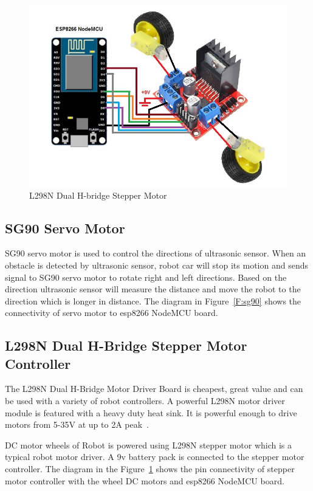 \begin{figure}[htb]
	\centering\includegraphics[width=\columnwidth]{images/L298N_Hbridge.jpg}
	\caption{L298N Dual H-bridge Stepper Motor}\label{F:stepper}
\end{figure}

\subsection{SG90 Servo Motor}
SG90 servo motor is used to control the directions of ultrasonic sensor. 
When an obstacle is detected by ultrasonic sensor, robot car will stop its 
motion and sends signal to SG90 servo motor to rotate right and left 
directions. Based on the direction ultrasonic sensor will measure the 
distance and move the robot to the direction which is longer in distance. 
The diagram in Figure~\ref{F:sg90} shows the  connectivity of servo motor to 
esp8266 NodeMCU board.

\subsection{L298N Dual H-Bridge Stepper Motor Controller}
The L298N Dual H-Bridge Motor Driver Board is cheapest, great value and can 
be used with a variety of robot controllers. A powerful L298N motor driver 
module is featured with a heavy duty heat sink. It is powerful enough to 
drive motors from 5-35V at up to 2A peak~\cite{bananarobotics2013}.

DC motor wheels of Robot is powered using L298N stepper motor which is a 
typical robot motor driver. A 9v battery pack is connected to the stepper 
motor controller. The diagram in the Figure~\ref{F:stepper} shows the pin 
connectivity of stepper motor controller with the wheel DC motors and 
esp8266 NodeMCU board.

